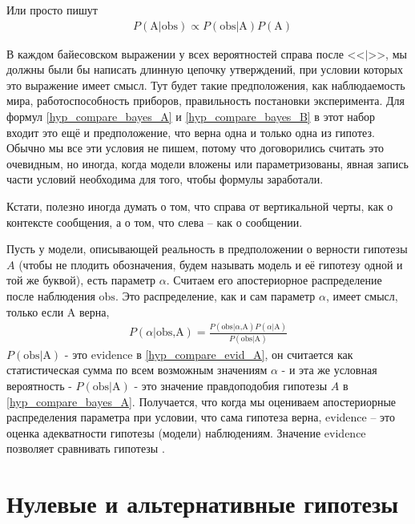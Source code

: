 \documentclass{book}
\begin{document}
Или просто пишут 
\begin{align*}\label{hyp_compare_bayes_null_prop}
   &P\left(\text{A|obs}\right)\propto P\left(\text{obs|A}\right) P\left(\text{A}\right)
\end{align*}

В каждом байесовском выражении у всех вероятностей справа после <<$\text{|}$>>, мы должны были бы написать длинную цепочку утверждений, при условии которых это выражение имеет смысл. Тут будет такие предположения, как наблюдаемость мира, работоспособность приборов, правильность постановки эксперимента. Для формул \eqref{hyp_compare_bayes_A} и \eqref{hyp_compare_bayes_B} в этот набор входит это ещё и предположение, что верна одна и только одна из гипотез. Обычно мы все эти условия не пишем, потому что договорились считать это очевидным, но иногда, когда модели вложены или параметризованы, явная запись части условий необходима для того, чтобы формулы заработали.  
 
Кстати, полезно иногда думать о том, что справа от вертикальной черты, как о контексте сообщения, а о том, что слева -- как о сообщении. 
 
Пусть у модели, описывающей реальность в предположении о верности гипотезы $A$ (чтобы не плодить обозначения, будем называть модель и её гипотезу одной и той же буквой),  есть параметр $\alpha$. Считаем его апостериорное распределение после наблюдения $\text{obs}$. Это распределение, как и сам параметр $\alpha$, имеет смысл, только если $\text{A}$ верна,
\begin{align}\label{hyp_compare_evid_A}
   P\left(\alpha\text{|obs,A}\right)=\frac{P\left(\text{obs|}\alpha\text{,A}\right) P\left(\alpha\text{|A}\right)}{P\left(\text{obs|A}\right)}
\end{align}
$P\left(\text{obs|A}\right)$ - это evidence в \eqref{hyp_compare_evid_A}, он считается как статистическая сумма по всем возможным значениям $\alpha$ - и эта же условная вероятность - $P\left(\text{obs|A}\right)$ - это значение правдоподобия гипотезы $A$ в \eqref{hyp_compare_bayes_A}. Получается, что когда мы оцениваем апостериорные распределения параметра при условии, что сама гипотеза верна, evidence -- это оценка адекватности гипотезы (модели) наблюдениям. Значение evidence позволяет сравнивать гипотезы \citep[подробнее см.][]{skilling_nested_2006}.

\section*{Нулевые и альтернативные гипотезы}
\end{document}
